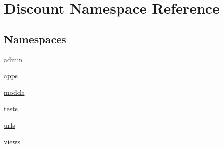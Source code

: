 \hypertarget{namespace_discount}{}\section{Discount Namespace Reference}
\label{namespace_discount}
\subsection*{Namespaces}
\begin{DoxyCompactItemize}
\item 
 \hyperlink{namespace_discount_1_1admin}{admin}
\item 
 \hyperlink{namespace_discount_1_1apps}{apps}
\item 
 \hyperlink{namespace_discount_1_1models}{models}
\item 
 \hyperlink{namespace_discount_1_1tests}{tests}
\item 
 \hyperlink{namespace_discount_1_1urls}{urls}
\item 
 \hyperlink{namespace_discount_1_1views}{views}
\end{DoxyCompactItemize}
